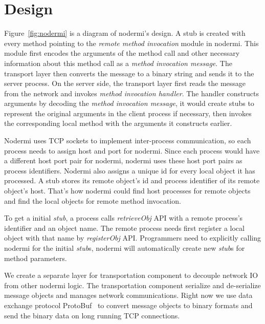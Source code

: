 \section{Design}

\nodermifig{}

Figure~\ref{fig:nodermi} is a diagram of nodermi's design.
A stub is created with every method pointing to the 
\emph{remote method invocation} module in nodermi.
This module
first encodes the arguments of the method call
 and other necessary information about this method call
as a \emph{method invocation message}.
The transport layer then converts the message to
a binary string and sends it
to the server process.
On the server side, the transport layer first reads 
the message from the network and invokes \emph{method invocation handler}.
The handler
constructs arguments by decoding the \emph{method invocation message}, 
it would create stubs to represent the original arguments in the client process
 if necessary,
then invokes the corresponding local method with the arguments
it constructs earlier.


Nodermi uses TCP sockets to implement inter-process communication,
so each process needs to assign host and port for nodermi.
Since each process would have a different host port pair for nodermi,
nodermi uses these host port pairs as process identifiers.
Nodermi also assigns a unique id for every local object it has processed.
A stub stores its remote object's id and process identifier of its remote object's host.
That's how nodermi could find host processes for remote objects and
find the local objects for remote method invocation.

To get a initial \emph{stub}, a process 
calls \emph{retrieveObj} API with a remote process's identifier and 
an object name.
The remote process needs first register a local object with that name by
\emph{registerObj} API.
Programmers need to explicitly calling nodermi for the initial \emph{stub}s,
nodermi will automatically create new \emph{stub}s for method parameters.


We create a separate layer for transportation component to decouple network
IO from other nodermi logic.
The transportation component serialize and de-serialize message objects
and manages network communications.
Right now we use data exchange protocol ProtoBuf~\cite{protobuf} to convert message objects to binary
formats and send the binary data on long running TCP connections.

